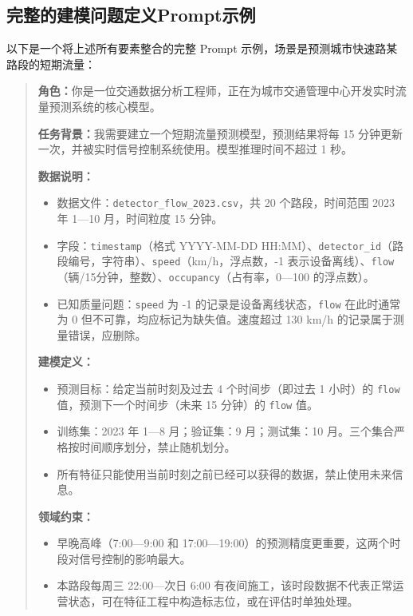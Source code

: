 \subsection{完整的建模问题定义Prompt示例}

以下是一个将上述所有要素整合的完整 Prompt 示例，场景是预测城市快速路某路段的短期流量：

\begin{quote}
\textbf{角色：}你是一位交通数据分析工程师，正在为城市交通管理中心开发实时流量预测系统的核心模型。

\textbf{任务背景：}我需要建立一个短期流量预测模型，预测结果将每 15 分钟更新一次，并被实时信号控制系统使用。模型推理时间不超过 1 秒。

\textbf{数据说明：}
\begin{itemize}
  \item 数据文件：\texttt{detector\_flow\_2023.csv}，共 20 个路段，时间范围 2023 年 1—10 月，时间粒度 15 分钟。
  \item 字段：\texttt{timestamp}（格式 YYYY-MM-DD HH:MM）、\texttt{detector\_id}（路段编号，字符串）、\texttt{speed}（km/h，浮点数，-1 表示设备离线）、\texttt{flow}（辆/15分钟，整数）、\texttt{occupancy}（占有率，0—100 的浮点数）。
  \item 已知质量问题：\texttt{speed} 为 -1 的记录是设备离线状态，\texttt{flow} 在此时通常为 0 但不可靠，均应标记为缺失值。速度超过 130 km/h 的记录属于测量错误，应删除。
\end{itemize}

\textbf{建模定义：}
\begin{itemize}
  \item 预测目标：给定当前时刻及过去 4 个时间步（即过去 1 小时）的 \texttt{flow} 值，预测下一个时间步（未来 15 分钟）的 \texttt{flow} 值。
  \item 训练集：2023 年 1—8 月；验证集：9 月；测试集：10 月。三个集合严格按时间顺序划分，禁止随机划分。
  \item 所有特征只能使用当前时刻之前已经可以获得的数据，禁止使用未来信息。
\end{itemize}

\textbf{领域约束：}
\begin{itemize}
  \item 早晚高峰（7:00—9:00 和 17:00—19:00）的预测精度更重要，这两个时段对信号控制的影响最大。
  \item 本路段每周三 22:00—次日 6:00 有夜间施工，该时段数据不代表正常运营状态，可在特征工程中构造标志位，或在评估时单独处理。
\end{itemize}


\end{quote}

